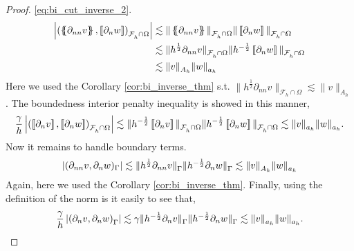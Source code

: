 \begin{proof}
                \eqref{eq:bi_cut_inverse_2}.
                \[
                    \begin{split}
                    \abs{\left( \mean{ \partial _{n n} v }, \jump{ \partial _{n}w }      \right)_{\mathcal{F}_{h}^{} \cap \Omega}  } & \lesssim  \|\mean{ \partial _{n n} v }  \|_{ \mathcal{F}_{h}^{} \cap \Omega}^{  }\|\jump{ \partial _{n} w }  \|_{
                    \mathcal{F}_{h}^{} \cap \Omega}^{  } \\
                    & \lesssim  \|h^{\frac{1}{2}} \partial _{n n} v  \|_{ \mathcal{F}_{h}^{} \cap \Omega}^{  }\| h^{-\frac{1}{2}} \jump{ \partial _{n} w }     \|_{\mathcal{F}_{h}^{} \cap \Omega}^{  } \\
                    & \lesssim  \| v \|_{A_{h}  }^{  } \|w    \|_{ a_{h}}^{  }
                    \end{split}
                \]
                Here we used the Corollary \ref{cor:bi_inverse_thm} s.t.  $\|h^{\frac{1}{2}} \partial _{n n}  v \|_{\mathcal{F}_{h}^{} \cap \Omega} \lesssim \| v \|_{ A_{h}  }^{  }  $.
              The boundedness interior penalty  inequality is showed in this manner, \[
             \frac{\gamma }{h} \abs{ \left( \jump{ \partial _{n} v}, \jump{ \partial _{n} w   }   \right)_{\mathcal{F}_{h}^{} \cap \Omega}  }  \lesssim  \|h^{-\frac{1}{2}} \jump{ \partial _{n} v}  \|_{ \mathcal{F}_{h}^{} \cap \Omega }^{  }
             \|h^{-\frac{1}{2}} \jump{ \partial _{n} w}  \|_{ \mathcal{F}_{h}^{} \cap \Omega }^{  }  \lesssim  \| v  \|_{ a_{h} }^{  }
             \| w  \|_{ a_{h} }^{  }.
             \]
              Now it remains to handle boundary terms. \[
                \left\lvert  ( \partial _{nn} v, \partial _{n} w)_{\Gamma }  \right\rvert  \lesssim \| h^{\frac{1}{2}}\partial _{nn} v \|_{\Gamma   }^{  } \| h^{-\frac{1}{2}} \partial _{n}w \|_{\Gamma   }^{  }  \lesssim \|  v \|_{A_{h}  }^{  } \| w \|_{ a_{h}   }^{  }
             \]
             Again, here we used the Corollary \ref{cor:bi_inverse_thm}.
             Finally, using the definition of the norm is it easily to see that,
             \[
\frac{\gamma }{h} \left\lvert  \left(  \partial _{n} v,  \partial _{n} w \right)_{\Gamma }   \right\rvert \lesssim \gamma  \| h^{-\frac{1}{2}} \partial _{n} v \|_{  \Gamma }^{  } \| h^{-\frac{1}{2}} \partial _{n} w \|_{\Gamma   }^{  } \lesssim \| v \|_{ a_{h} }^{  }
\| w \|_{ a_{h} }^{  } .
             \]


\end{proof}
